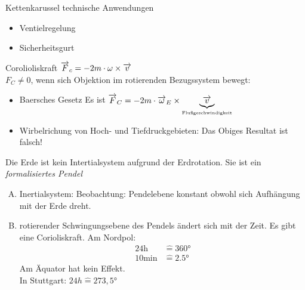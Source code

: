 \documentclass[a4paper,10pt]{scrartcl}
\begin{document}
\begin{enumerate}[a)]
\begin{seg}{Kettenkarussel}
technische Anwendungen
\begin{itemize}
\item Ventielregelung
\item Sicherheitsgurt 
\end{itemize}
\end{seg}
\begin{seg}{Corolioliskraft}
 $\overrightarrow{F}_c=-2m\cdot \omega \times \overrightarrow{v}$\\
$F_C\neq 0$, wenn sich Objektion im rotierenden Bezugssystem bewegt: 
\end{seg}
\begin{exs*}[Corioliskraft]
\begin{itemize}
 \item Baersches Gesetz 
Es ist $\overrightarrow{F}_C=-2m\cdot \overrightarrow{\omega}_E\times \underbrace{\overrightarrow{v}}_{\text{\tiny{Flußgeschwindigkeit}}}$
\item Wirbelrichung von Hoch- und Tiefdruckgebieten:
Das Obiges Resultat ist falsch!
\end{itemize}
\end{exs*}
Die Erde ist kein Intertialsystem aufgrund der Erdrotation.  Sie ist ein \emph{formalisiertes Pendel}
\\
\begin{enumerate}[(A)]
\item Inertialsystem:
Beobachtung: Pendelebene konstant obwohl sich Aufhängung mit der Erde dreht.
\item rotierender
Schwingungsebene des Pendels ändert sich mit der Zeit. Es gibt eine Corioliskraft. Am Nordpol:
\begin{align*}
24\text{h}&\hat = 360°\\
10 \text{min} &\hat = 2.5°
\end{align*}
Am Äquator hat kein Effekt.\\
In Stuttgart: $24h\hat =273,5°$
\end{enumerate}

\end{enumerate}
\end{document}
